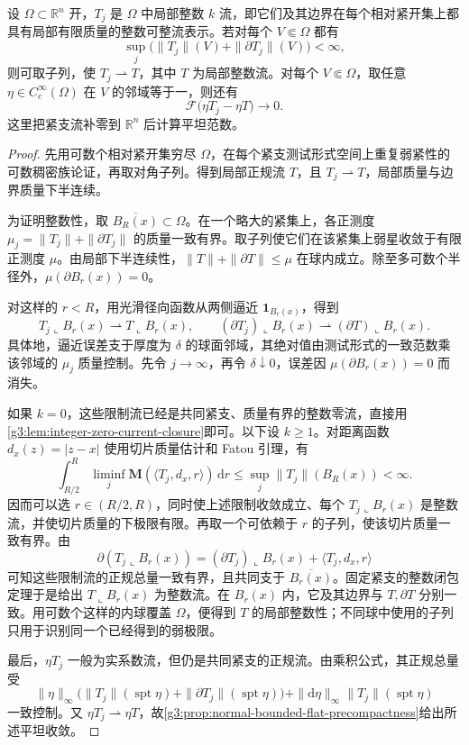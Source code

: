 \begin{theorem}\label{g3:thm:local-integral-current-compactness}
	设 \(\Omega\subset\mathbb R^n\) 开，\(T_j\) 是 \(\Omega\) 中局部整数 \(k\) 流，即它们及其边界在每个相对紧开集上都具有局部有限质量的整数可整流表示。若对每个 \(V\Subset\Omega\) 都有
	\[
		\sup_j\bigl(\|T_j\|(V)+\|\partial T_j\|(V)\bigr)<\infty,
	\]
	则可取子列，使 \(T_j\rightharpoonup T\)，其中 \(T\) 为局部整数流。对每个 \(V\Subset\Omega\)，取任意 \(\eta\in C_c^\infty(\Omega)\) 在 \(V\) 的邻域等于一，则还有
	\[
		\mathcal F\bigl(\eta T_j-\eta T\bigr)\longrightarrow0.
	\]
	这里把紧支流补零到 \(\mathbb R^n\) 后计算平坦范数。
\end{theorem}
\begin{proof}
	先用可数个相对紧开集穷尽 \(\Omega\)，在每个紧支测试形式空间上重复弱紧性的可数稠密族论证，再取对角子列。得到局部正规流 \(T\)，且 \(T_j\rightharpoonup T\)，局部质量与边界质量下半连续。

	为证明整数性，取 \(\overline{B_R(x)}\subset\Omega\)。在一个略大的紧集上，各正测度
	\(\mu_j=\|T_j\|+\|\partial T_j\|\) 的质量一致有界。取子列使它们在该紧集上弱星收敛于有限正测度 \(\mu\)。由局部下半连续性，\(\|T\|+\|\partial T\|\le\mu\) 在球内成立。除至多可数个半径外，\(\mu(\partial B_r(x))=0\)。

	对这样的 \(r<R\)，用光滑径向函数从两侧逼近 \(\mathbf1_{B_r(x)}\)，得到
	\[
		T_j\llcorner B_r(x)\rightharpoonup T\llcorner B_r(x),\qquad
		(\partial T_j)\llcorner B_r(x)\rightharpoonup
		(\partial T)\llcorner B_r(x).
	\]
	具体地，逼近误差支于厚度为 \(\delta\) 的球面邻域，其绝对值由测试形式的一致范数乘该邻域的 \(\mu_j\) 质量控制。先令 \(j\to\infty\)，再令 \(\delta\downarrow0\)，误差因 \(\mu(\partial B_r(x))=0\) 而消失。

	如果 \(k=0\)，这些限制流已经是共同紧支、质量有界的整数零流，直接用\cref{g3:lem:integer-zero-current-closure}即可。以下设 \(k\ge1\)。对距离函数 \(d_x(z)=|z-x|\) 使用切片质量估计和 Fatou 引理，有
	\[
		\int_{R/2}^{R}\liminf_j
		\mathbf M(\langle T_j,d_x,r\rangle)\,\mathrm dr
		\le\sup_j\|T_j\|(B_R(x))<\infty.
	\]
	因而可以选 \(r\in(R/2,R)\)，同时使上述限制收敛成立、每个 \(T_j\llcorner B_r(x)\) 是整数流，并使切片质量的下极限有限。再取一个可依赖于 \(r\) 的子列，使该切片质量一致有界。由
	\[
		\partial(T_j\llcorner B_r(x))
		=(\partial T_j)\llcorner B_r(x)+\langle T_j,d_x,r\rangle
	\]
	可知这些限制流的正规总量一致有界，且共同支于 \(\overline{B_r(x)}\)。固定紧支的整数闭包定理于是给出 \(T\llcorner B_r(x)\) 为整数流。在 \(B_r(x)\) 内，它及其边界与 \(T,\partial T\) 分别一致。用可数个这样的内球覆盖 \(\Omega\)，便得到 \(T\) 的局部整数性；不同球中使用的子列只用于识别同一个已经得到的弱极限。

	最后，\(\eta T_j\) 一般为实系数流，但仍是共同紧支的正规流。由乘积公式，其正规总量受
	\[
		\|\eta\|_\infty
		\bigl(\|T_j\|(\operatorname{spt}\eta)+\|\partial T_j\|(\operatorname{spt}\eta)\bigr)
		+\|\mathrm d\eta\|_\infty\|T_j\|(\operatorname{spt}\eta)
	\]
	一致控制。又 \(\eta T_j\rightharpoonup\eta T\)，故\cref{g3:prop:normal-bounded-flat-precompactness}给出所述平坦收敛。
\end{proof}

